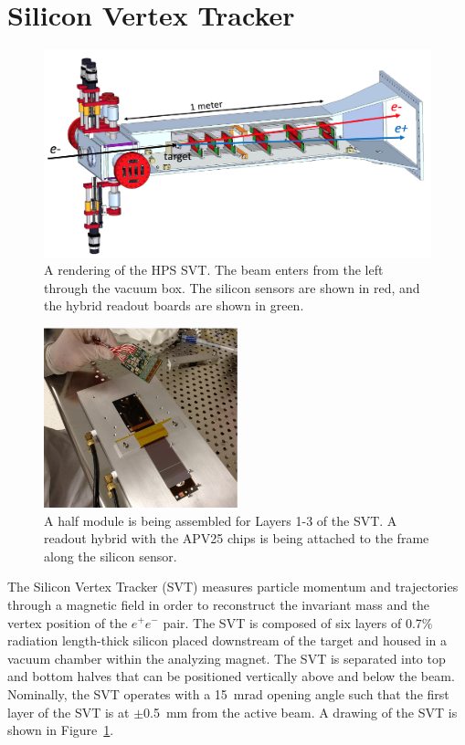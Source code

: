 \section{Silicon Vertex Tracker}
\begin{figure}[htb]
  \centering
      \includegraphics[width=1.0\textwidth]{pics/experiment/svt.png}
  \caption[Rendering of the HPS SVT]{A rendering of the HPS SVT. The beam enters from the left through the vacuum box. The silicon sensors are shown in red, and the hybrid readout boards are shown in green.}
  \label{Figure:svt}
\end{figure}

\begin{figure}[h]
  \centering
      \includegraphics[width=0.5\textwidth]{pics/experiment/svtSensorAssembly.png}
  \caption[Assembly of a half module of the SVT ]{A half module is being assembled for Layers 1-3 of the SVT. A readout hybrid with the APV25 chips is being attached to the frame along the silicon sensor.~\cite{collaboration_heavy_2013}}
  \label{Figure:svtAssembly}
\end{figure}

The Silicon Vertex Tracker (SVT) measures particle momentum and trajectories through a magnetic field in order to reconstruct the invariant mass and the vertex position of the $e^+e^-$ pair. The SVT is composed of six layers of 0.7$\%$ radiation length-thick silicon placed downstream of the target and housed in a vacuum chamber within the analyzing magnet. The SVT is separated into top and bottom halves that can be positioned vertically above and below the beam. Nominally, the SVT operates with a 15~mrad opening angle such that the first layer of the SVT is at $\pm$0.5~mm from the active beam. A drawing of the SVT is shown in Figure~\ref{Figure:svt}.

